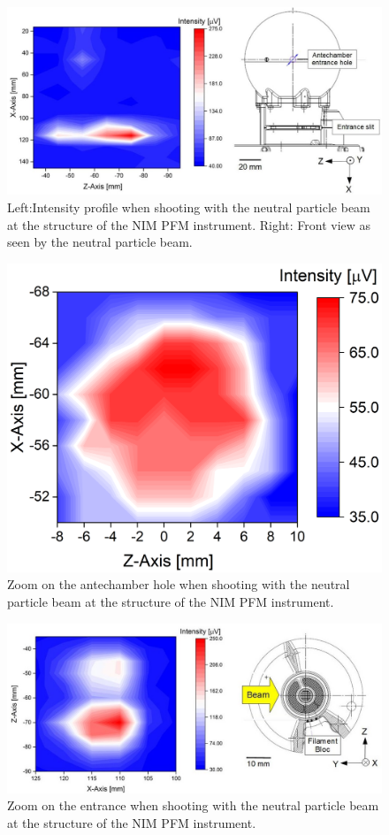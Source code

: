 	\begin{figure}[h!]
		\centering
		\includegraphics[width=\textwidth]{Experiments/2D_scan_anteEntr.jpg}
		\caption{Left:Intensity profile when shooting with the neutral particle beam at the structure of the NIM PFM instrument. Right: Front view as seen by the neutral particle beam.}
		\label{exp:PFMIntCharTot}
	\end{figure}
	\begin{figure}[h!]
		\centering
		\includegraphics[width=.7\textwidth]{Experiments/2D_scan_Ant.png}
		\caption{Zoom on the antechamber hole when shooting with the neutral particle beam at the structure of the NIM PFM instrument.}
		\label{exp:PFMIntCharAnt}
	\end{figure}	
	\begin{figure}[h!]
		\centering
		\includegraphics[width=\textwidth]{Experiments/2D_scan_Entr.jpg}
		\caption{Zoom on the entrance when shooting with the neutral particle beam at the structure of the NIM PFM instrument.}
		\label{exp:PFMIntCharEnt}
	\end{figure}	
